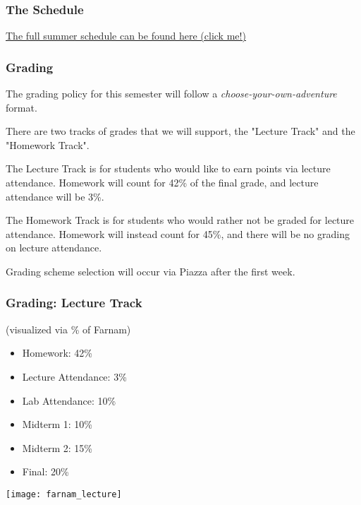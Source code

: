 \documentclass[aspectratio=169, handout]{beamer}
\begin{document}
\begin{frame}[fragile]
  \frametitle{The Schedule}
  \begin{center}
    \large
    \color{blue}
    \href{https://docs.google.com/spreadsheets/d/1Q6utpsc1vm2WbW2aDyR4mGiFoDJSiBsVSiQmkBarqT0/edit?usp=sharing}{The full summer schedule can be found here (click me!)}
  \end{center}
\end{frame}

\begin{frame}[fragile]
  \frametitle{Grading}

  The grading policy for this semester will follow a \textit{choose-your-own-adventure} format.

  \pause
  \vspace{\fill}

  There are two tracks of grades that we will support, the "Lecture Track" and the "Homework Track".

  \pause
  \vspace{\fill}

  The Lecture Track is for students who would like to earn points via lecture attendance. Homework
  will count for 42\% of the final grade, and lecture attendance will be 3\%.

  \vspace{5pt}

  The Homework Track is for students who would rather not be graded for lecture attendance. Homework
  will instead count for 45\%, and there will be no grading on lecture attendance.

  \vspace{\fill}

  Grading scheme selection will occur via Piazza after the first week.
\end{frame}

\begin{frame}[fragile]
  \frametitle{Grading: Lecture Track}

  \begin{minipage}{0.59\textwidth}
    (visualized via \% of Farnam) \\

    \vspace{\fill}

    \begin{itemize}
      \item Homework: 42\%
      \item Lecture Attendance: 3\%
      \item Lab Attendance: 10\%
      \item Midterm 1: 10\%
      \item Midterm 2: 15\%
      \item Final: 20\%
    \end{itemize}
  \end{minipage}
  \begin{minipage}{0.4\textwidth}
    \texttt{[image: farnam\_lecture]}
  \end{minipage}
\end{frame}
\end{document}
